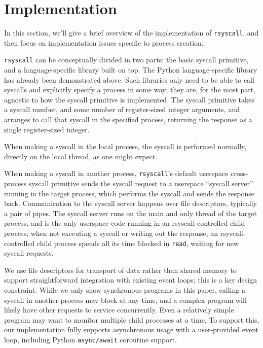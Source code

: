 \documentclass[letterpaper,twocolumn,10pt]{article}
\begin{document}
\section{Implementation}\label{implementation}
In this section, we'll give a brief overview of the implementation of \texttt{rsyscall},
and then focus on implementation issues specific to process creation.

\texttt{rsyscall} can be conceptually divided in two parts:
the basic syscall primitive,
and a language-specific library built on top.
The Python language-specific library has already been demonstrated above.
Such libraries only need to be able to call syscalls and explicitly specify a process in some way;
they are, for the most part, agnostic to how the syscall primitive is implemented.
The syscall primitive takes a syscall number, and some number of register-sized integer arguments,
and arranges to call that syscall in the specified process,
returning the response as a single register-sized integer.

When making a syscall in the local process, the syscall is performed normally,
directly on the local thread, as one might expect.

When making a syscall in another process,
\texttt{rsyscall}'s default userspace cross-process syscall primitive sends the syscall request
to a userspace ``syscall server'' running in the target process,
which performs the syscall and sends the response back.
Communication to the syscall server happens over file descriptors,
typically a pair of pipes.
The syscall server runs on the main and only thread of the target process,
and is the only userspace code running in an rsyscall-controlled child process;
when not executing a syscall or writing out the response,
an rsyscall-controlled child process spends all its time blocked in \texttt{read},
waiting for new syscall requests.

We use file descriptors for transport of data rather than shared memory
to support straightforward integration with existing event loops;
this is a key design constraint.
While we only show synchronous programs in this paper,
calling a syscall in another process may block at any time,
and a complex program will likely have other requests to service concurrently.
Even a relatively simple program may want to monitor multiple child processes at a time.
To support this,
our implementation fully supports asynchronous usage with a user-provided event loop,
including Python \texttt{async/await} coroutine support\cite{python_coroutines}.
\end{document}
